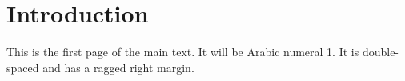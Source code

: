 \documentclass{mythesis}
\begin{document}
\makefrontmatter




\startprelimnumbering 



\clearpage
\tableofcontents

\clearpage
\listoftables

\clearpage
\listoffigures

\makemainmatter

\section{Introduction}
This is the first page of the main text. It will be Arabic numeral 1. It is double-spaced and has a ragged right margin. 
\end{document}
